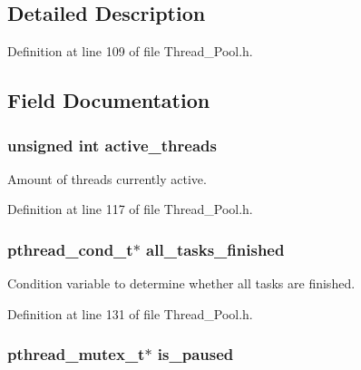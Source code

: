 \subsection{Detailed Description}


Definition at line 109 of file Thread\+\_\+\+Pool.\+h.



\subsection{Field Documentation}
\hypertarget{struct_thread___pool_af185a17406e07af53296afac2f2abd2e}{}
\subsubsection[{active\+\_\+threads}]{\setlength{\rightskip}{0pt plus 5cm}unsigned int active\+\_\+threads}\label{struct_thread___pool_af185a17406e07af53296afac2f2abd2e}


Amount of threads currently active. 



Definition at line 117 of file Thread\+\_\+\+Pool.\+h.

\hypertarget{struct_thread___pool_ae6ad6219d9d18c6ee81facfdcea985cc}{}
\subsubsection[{all\+\_\+tasks\+\_\+finished}]{\setlength{\rightskip}{0pt plus 5cm}pthread\+\_\+cond\+\_\+t$\ast$ all\+\_\+tasks\+\_\+finished}\label{struct_thread___pool_ae6ad6219d9d18c6ee81facfdcea985cc}


Condition variable to determine whether all tasks are finished. 



Definition at line 131 of file Thread\+\_\+\+Pool.\+h.

\hypertarget{struct_thread___pool_a23ef75e4be23253924732dbbe0cb906c}{}
\subsubsection[{is\+\_\+paused}]{\setlength{\rightskip}{0pt plus 5cm}pthread\+\_\+mutex\+\_\+t$\ast$ is\+\_\+paused}\label{struct_thread___pool_a23ef75e4be23253924732dbbe0cb906c}


